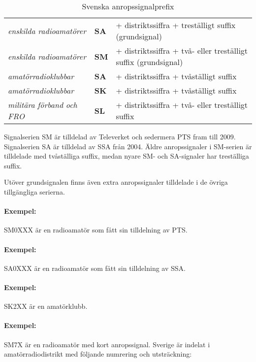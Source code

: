 \begin{table*}[ht]
  \begin{center}
    \begin{tabular}{lll}
      \emph{enskilda radioamatörer} & \textbf{SA} &
      + distriktssiffra + treställigt suffix (grundsignal) \\
      \emph{enskilda radioamatörer} & \textbf{SM} &
      + distriktssiffra + två- eller treställigt suffix (grundsignal) \\
      \emph{amatörradioklubbar} & \textbf{SA} &
      + distriktssiffra + tvåställigt suffix \\
      \emph{amatörradioklubbar} & \textbf{SK} &
      + distriktssiffra + tvåställigt suffix \\
      \emph{militära förband och FRO} & \textbf{SL} &
      + distriktssiffra + två- eller treställigt suffix \\
    \end{tabular}
    \caption{Svenska anropssignalprefix}
    \label{tab:seprefix}
  \end{center}
\end{table*}

Signalserien SM är tilldelad av Televerket och sedermera PTS fram till 2009.
Signalserien SA är tilldelad av SSA från 2004.
Äldre anropssignaler i SM-serien är tilldelade med tvåställiga suffix, medan
nyare SM- och SA-signaler har treställiga suffix.

Utöver grundsignalen finns även extra anropssignaler tilldelade i de övriga tillgängliga serierna.
\paragraph{Exempel:} SM0XXX är en radioamatör som fått sin tilldelning av PTS.
\paragraph{Exempel:} SA0XXX är en radioamatör som fått sin tilldelning av SSA.
\paragraph{Exempel:} SK2XX är en amatörklubb.
\paragraph{Exempel:} SM7X är en radioamatör med kort anropssignal.
\vspace{1ex}
Sverige är indelat i amatörradiodistrikt med följande numrering och
utsträckning:

